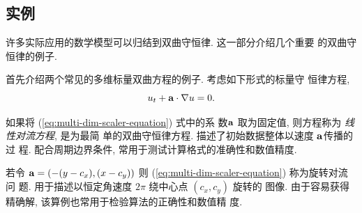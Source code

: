 
\subsection{实例}
\label{sec:hyperbolic-conservation-law-examples}
许多实际应用的数学模型可以归结到双曲守恒律. 这一部分介绍几个重要
的双曲守恒律的例子.

\begin{example}
  首先介绍两个常见的多维标量双曲方程的例子. 考虑如下形式的标量守
  恒律方程,
  \begin{equation}
    \label{eq:multi-dim-scaler-equation}
    u_{t} + {\bf{a}} \cdot \nabla u = 0.
  \end{equation}

  如果将 (\ref{eq:multi-dim-scaler-equation}) 式中的系
  数${\bf{a}}$ 取为固定值, 则方程称为 {\it 线性对流方程}, 是为最简
  单的双曲守恒律方程. 描述了初始数据整体以速度 ${\bf{a}}$传播的过
  程. 配合周期边界条件, 常用于测试计算格式的准确性和数值精度.

  若令 ${\bf{a}} = \left( -(y-c_{x}), (x-c_{y})
  \right)$ 则 (\ref{eq:multi-dim-scaler-equation}) 称为旋转对流问
  题. 用于描述以恒定角速度 $2\pi$ 绕中心点 $(c_{x}, c_{y})$ 旋转的
  图像. 由于容易获得精确解, 该算例也常用于检验算法的正确性和数值精
  度.

\end{example}
